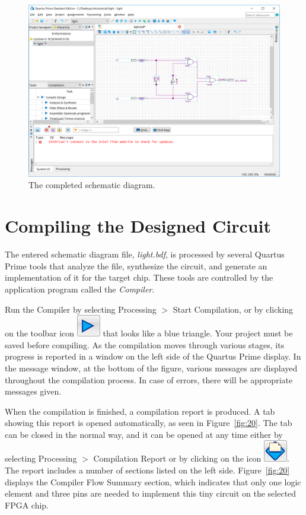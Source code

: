 \documentclass[11pt, twoside, pdftex]{article}
\begin{document}
\begin{figure}[H]
   \begin{center}
      \includegraphics[scale=0.4]{figures/figure19.png}
   \caption{The completed schematic diagram.} 
	 \label{fig:19}
	 \end{center}
\end{figure}

\section{Compiling the Designed Circuit}

The entered schematic diagram file, {\it light.bdf}, is processed by several 
Quartus Prime tools that analyze the file, synthesize the circuit,
and generate an implementation of it for the target chip. 
These tools are controlled by the application program called the {\it Compiler}.

Run the Compiler by selecting {\sf Processing $>$ Start Compilation}, or by 
clicking on the toolbar icon \includegraphics[scale=0.45]{figures/icon5.png} that looks like a
blue triangle. Your project must be saved before compiling. 
As the compilation moves through various stages, its progress is reported
in a window on the left side of the Quartus Prime display.
In the message window, at the bottom of the figure, various messages are displayed
throughout the compilation process.
In case of errors, there will be appropriate messages given.

When the compilation is finished, a compilation report is produced.
A tab showing this report is opened automatically, as seen in Figure~\ref{fig:20}.
The tab can be closed in the normal way, and it can be opened at any time
either by selecting {\sf Processing $>$ Compilation Report} or by clicking on 
the icon \includegraphics[scale=0.45]{figures/icon6.png}.
The report includes a number of sections listed on the left side.
Figure~\ref{fig:20} displays the Compiler Flow Summary section, which
indicates that only one logic element and three pins are needed to implement this 
tiny circuit on the selected FPGA chip.
\end{document}
